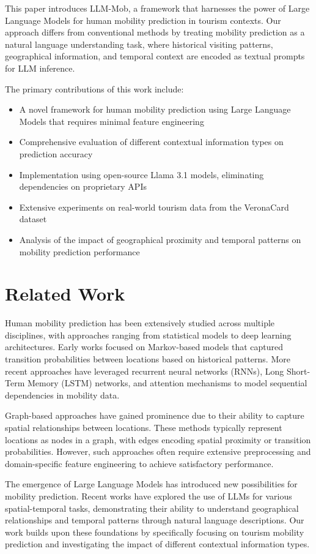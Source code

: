 \documentclass[12pt,a4paper]{article}
\begin{document}
This paper introduces LLM-Mob, a framework that harnesses the power of Large Language Models for human mobility prediction in tourism contexts. Our approach differs from conventional methods by treating mobility prediction as a natural language understanding task, where historical visiting patterns, geographical information, and temporal context are encoded as textual prompts for LLM inference.

The primary contributions of this work include:

\begin{itemize}
\item A novel framework for human mobility prediction using Large Language Models that requires minimal feature engineering
\item Comprehensive evaluation of different contextual information types on prediction accuracy
\item Implementation using open-source Llama 3.1 models, eliminating dependencies on proprietary APIs
\item Extensive experiments on real-world tourism data from the VeronaCard dataset
\item Analysis of the impact of geographical proximity and temporal patterns on mobility prediction performance
\end{itemize}

\section{Related Work}

Human mobility prediction has been extensively studied across multiple disciplines, with approaches ranging from statistical models to deep learning architectures. Early works focused on Markov-based models that captured transition probabilities between locations based on historical patterns. More recent approaches have leveraged recurrent neural networks (RNNs), Long Short-Term Memory (LSTM) networks, and attention mechanisms to model sequential dependencies in mobility data.

Graph-based approaches have gained prominence due to their ability to capture spatial relationships between locations. These methods typically represent locations as nodes in a graph, with edges encoding spatial proximity or transition probabilities. However, such approaches often require extensive preprocessing and domain-specific feature engineering to achieve satisfactory performance.

The emergence of Large Language Models has introduced new possibilities for mobility prediction. Recent works have explored the use of LLMs for various spatial-temporal tasks, demonstrating their ability to understand geographical relationships and temporal patterns through natural language descriptions. Our work builds upon these foundations by specifically focusing on tourism mobility prediction and investigating the impact of different contextual information types.
\end{document}
